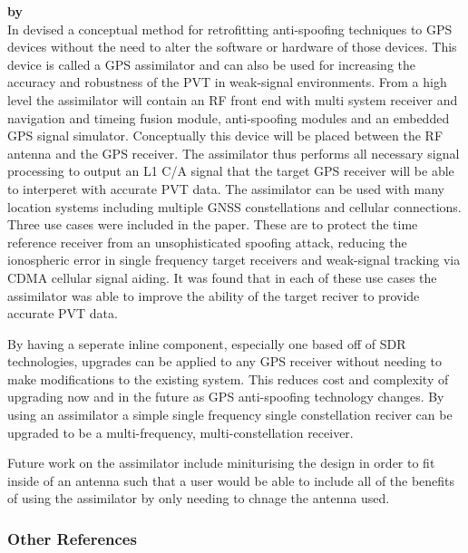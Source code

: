 \medskip

\textbf{\emph{} by \citeauthor{RN19}} \\
In \citeyear{RN19} \citeauthor{RN19} \cite{RN19} devised a conceptual method for retrofitting anti-spoofing techniques to GPS devices without the need
to alter the software or hardware of those devices. This device is called a GPS assimilator and can also be used for increasing the accuracy and robustness
of the PVT in weak-signal environments. From a high level the assimilator will contain an RF front end with multi system receiver and navigation and timeing fusion module,  
anti-spoofing modules and an embedded GPS signal simulator. Conceptually this device will be placed between the RF antenna and the GPS receiver. The assimilator thus performs
all necessary signal processing to output an L1 C/A signal that the target GPS receiver will be able to interperet with accurate PVT data. The assimilator
can be used with many location systems including multiple GNSS constellations and cellular connections. Three use cases were included in the paper.
These are to protect the time reference receiver from an unsophisticated spoofing attack, reducing the ionospheric error in single frequency target
receivers and weak-signal tracking via CDMA cellular signal aiding. It was found that in each of these use cases the assimilator was able to improve
the ability of the target reciver to provide accurate PVT data.

By having a seperate inline component, especially one based off of SDR technologies, upgrades can be applied to any GPS receiver without needing to
make modifications to the existing system. This reduces cost and complexity of upgrading now and in the future as GPS anti-spoofing technology changes.
By using an assimilator a simple single frequency single constellation reciver can be upgraded to be a multi-frequency, multi-constellation receiver.

Future work on the assimilator include miniturising the design in order to fit inside of an antenna such that a user would be able to include all of the 
benefits of using the assimilator by only needing to chnage the antenna used. 


\subsubsection{Other References}

